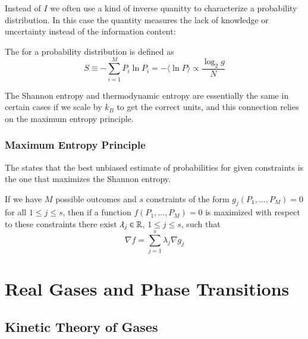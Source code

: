 \documentclass[12pt, a4paper, oneside, openright, titlepage]{book}
\begin{document}
Instead of $I$ we often use a kind of inverse quanitty to characterize a probability distribution. In this case the quantity measures the lack of knowledge or uncertainty instead of the information content:

\begin{defn}
    The  for a probability distribution is defined as \begin{equation*}
        S \equiv -\sum_{i=1}^MP_i\ln P_i = -\langle \ln P\rangle \propto\frac{\log_2g}{N}
    \end{equation*}
\end{defn}

The Shannon entropy and thermodynamic entropy are essentially the same in certain cases if we scale by $k_B$ to get the correct units, and this connection relies on the maximum entropy principle.


\section{Maximum Entropy Principle}

\begin{thm}
    The  states that the best unbiased estimate of probabilities for given constraints is the one that maximizes the Shannon entropy.
\end{thm}

If we have $M$ possible outcomes and $s$ constraints of the form $g_j(P_1,...,P_M) = 0$ for all $1 \leq j \leq s$, then if a function $f(P_1,...,P_M) = 0$ is maximized with respect to these constraints there exist $\lambda_j \in \mathbb R$, $1 \leq j \leq s$, such that \begin{equation*}
    \nabla f = \sum_{j=1}^s\lambda_j\nabla g_j
\end{equation*}







\part{Real Gases and Phase Transitions}


\chapter{Kinetic Theory of Gases}
\end{document}

